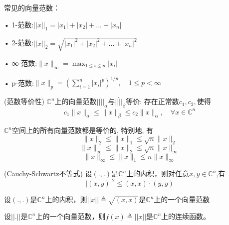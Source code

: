 \documentclass[12pt,a4paper]{article}
\begin{document}
常见的向量范数：

• 1-范数:$||x||_1=|x_1|+|x_2|+...+|x_n|$

• 2-范数:$||x||_2=\sqrt{|x_1|^2+|x_2|^2+...+|x_n|^2}$
 
• ∞-范数:$\|x\|_{\infty}=\max _{1 \leq i \leq n}\left|x_{i}\right|$

• p-范数:$\|x\|_{p}=\left(\sum_{i=1}^{n}\left|x_{i}\right|^{p}\right)^{1 / p}, \quad 1 \leq p<\infty$

\begin{framed}
	\begin{definition}(范数等价性)
		$\mathbb{C}^{n}$上的向量范数$||\dot||_{\alpha}$与$||\dot||_{\beta}$等价: 存在正常数$c_1, c_2,$使得
		$$c_{1}\|x\|_{\alpha} \leq\|x\|_{\beta} \leq c_{2}\|x\|_{\alpha}, \quad \forall x \in \mathbb{C}^{n}$$
	\end{definition}
\end{framed}

\begin{framed}
	\begin{theorem}
$\mathbb{C}^{n}$空间上的所有向量范数都是等价的, 特别地, 有
	$$
	\|x\|_{2} \leq\|x\|_{1} \leq \sqrt{n}\|x\|_{2}
	$$
	$$
	\|x\|_{\infty} \leq\|x\|_{2} \leq \sqrt{n}\|x\|_{\infty}
	$$
	$$
	\|x\|_{\infty} \leq\|x\|_{1} \leq n\|x\|_{\infty}
	$$
	\end{theorem}
\end{framed}

\begin{framed}
	\begin{theorem}(Cauchy-Schwartz不等式)
		设$(.,.)$是$\mathbb{C}^{n}$上的内积，则对任意$x,y \in \mathbb{C}^{n}$,有
		$$
		|(x, y)|^{2} \leq(x, x) \cdot(y, y)
		$$
	\end{theorem}
\end{framed}

\begin{framed}
	\begin{corollary}
		设$(.,.)$是$\mathbb{C}^{n}$上的内积，则$||x||\triangleq \sqrt{(x,x)}$是$\mathbb{C}^{n}$上的一个向量范数
	\end{corollary}
\end{framed}

\begin{framed}
	\begin{theorem}
		设$||.||$是$\mathbb{C}^{n}$上的一个向量范数，则$f(x)\triangleq||x||$是$\mathbb{C}^{n}$上的连续函数。
	\end{theorem}
\end{framed}
\end{document}
